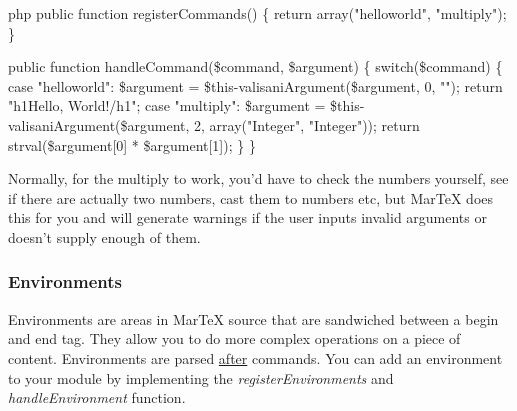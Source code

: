 \begin{code}{php}
public function registerCommands() \{
  return array("helloworld", "multiply");
\}

public function handleCommand(\$command, \$argument) \{
  switch(\$command) \{
    case "helloworld":
        \$argument = \$this-\>valisaniArgument(\$argument, 0, "");
        return "\<h1\>Hello, World!\</h1\>";
    case "multiply":
        \$argument = \$this-\>valisaniArgument(\$argument, 2, array("Integer", "Integer"));
        return strval(\$argument[0] * \$argument[1]);
    \}
\}
\end{code}
Normally, for the multiply to work, you'd have to check the numbers yourself, see if there are actually two numbers, cast them to numbers etc, but MarTeX does this for you and will generate warnings if the user inputs invalid arguments or doesn't supply enough of them.

\subsubsection{Environments}
Environments are areas in MarTeX source that are sandwiched between a begin and end tag. They allow you to do more complex operations on a piece of content. Environments are parsed \underline{after} commands. You can add an environment to your module by implementing the \textit{registerEnvironments} and \textit{handleEnvironment} function.



